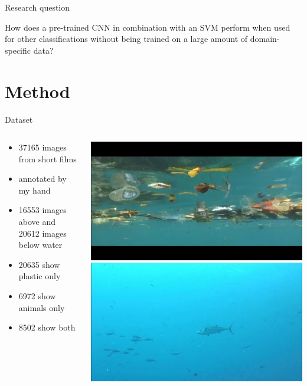 \documentclass{beamer}
\begin{document}
    \begin{frame}{Research question}
        \begin{block}{How does a pre-trained CNN in combination with an SVM perform when used for other classifications without being trained on a large amount of domain-specific data?}
        \end{block}
    \end{frame}

\section{Method}
    \begin{frame}{Dataset}
        \begin{columns}[c]
            \begin{column}{.5\textwidth}
                \begin{itemize}
                \item 37165 images from short films
                \item annotated by my hand
                \item 16553 images above and 20612 images below water
                \item 20635 show plastic only
                \item 6972 show animals only
                \item 8502 show both
                \end{itemize}
            \end{column}
            \begin{column}{.4\textwidth}
                \includegraphics[width=\textwidth]{images/10947_01.jpg}\\
                \includegraphics[width=\textwidth]{images/19358_10.jpg}\\

\end{column}
\end{columns}
\end{frame}
\end{document}

